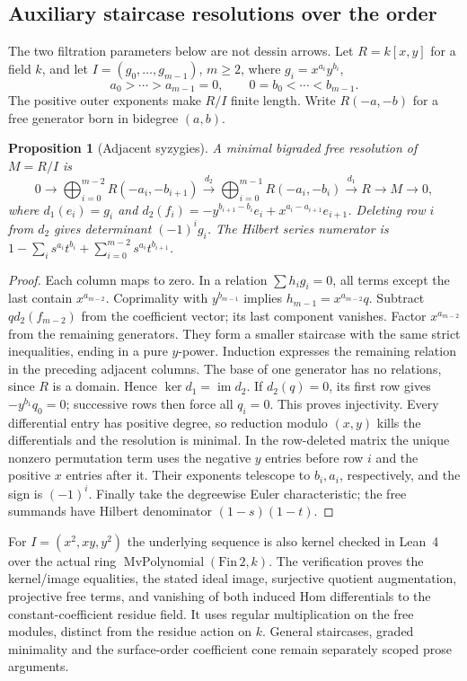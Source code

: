 \documentclass[11pt]{article}
\newtheorem{proposition}[theorem]{Proposition}
\theoremstyle{definition}\newtheorem{definition}[theorem]{Definition}
\theoremstyle{remark}\newtheorem{remark}[theorem]{Remark}
\begin{document}
\subsection{Auxiliary staircase resolutions over the order}
The two filtration parameters below are not dessin arrows. Let $R=k[x,y]$
for a field $k$, and let $I=(g_0,\ldots,g_{m-1})$, $m\ge2$, where
$g_i=x^{a_i}y^{b_i}$,
\[
 a_0>\cdots>a_{m-1}=0,\qquad 0=b_0<\cdots<b_{m-1}.
\]
The positive outer exponents make $R/I$ finite length. Write $R(-a,-b)$
for a free generator born in bidegree $(a,b)$.
\begin{proposition}[Adjacent syzygies]\label{thm:staircase}
A minimal bigraded free resolution of $M=R/I$ is
\[
0\longrightarrow\bigoplus_{i=0}^{m-2}R(-a_i,-b_{i+1})
\xrightarrow{d_2}\bigoplus_{i=0}^{m-1}R(-a_i,-b_i)
\xrightarrow{d_1}R\longrightarrow M\longrightarrow0,
\]
where $d_1(e_i)=g_i$ and
$d_2(f_i)=-y^{b_{i+1}-b_i}e_i+x^{a_i-a_{i+1}}e_{i+1}$.
Deleting row $i$ from $d_2$ gives determinant $(-1)^ig_i$.
The Hilbert series numerator is
$1-\sum_i s^{a_i}t^{b_i}+\sum_{i=0}^{m-2}s^{a_i}t^{b_{i+1}}$.
\end{proposition}
\begin{proof}
Each column maps to zero. In a relation $\sum h_i g_i=0$, all terms except
the last contain $x^{a_{m-2}}$. Coprimality with $y^{b_{m-1}}$ implies
$h_{m-1}=x^{a_{m-2}}q$. Subtract $q d_2(f_{m-2})$ from the coefficient
vector; its last component vanishes. Factor $x^{a_{m-2}}$ from the remaining
generators. They form a smaller staircase with the same strict inequalities,
ending in a pure $y$-power. Induction expresses the remaining relation in
the preceding adjacent columns. The base of one generator has no relations,
since $R$ is a domain. Hence $\ker d_1=\operatorname{im}d_2$.
If $d_2(q)=0$, its first row gives $-y^{b_1}q_0=0$; successive rows then
force all $q_i=0$. This proves injectivity. Every differential entry has
positive degree, so reduction modulo $(x,y)$ kills the differentials and
the resolution is minimal. In the row-deleted matrix the unique nonzero
permutation term uses the negative $y$ entries before row $i$ and the
positive $x$ entries after it. Their exponents telescope to $b_i,a_i$,
respectively, and the sign is $(-1)^i$. Finally take the degreewise Euler
characteristic; the free summands have Hilbert denominator $(1-s)(1-t)$.
\end{proof}
For $I=(x^2,xy,y^2)$ the underlying sequence is also kernel checked
in Lean~4 over the actual ring $\operatorname{MvPolynomial}(\mathrm{Fin}\,2,k)$.
The verification proves the kernel/image equalities, the stated ideal image,
surjective quotient augmentation, projective free terms, and vanishing of
both induced Hom differentials to the constant-coefficient residue field.
It uses regular multiplication on the free modules, distinct from the
residue action on $k$. General staircases, graded minimality and the
surface-order coefficient cone remain separately scoped prose arguments.
\end{document}
